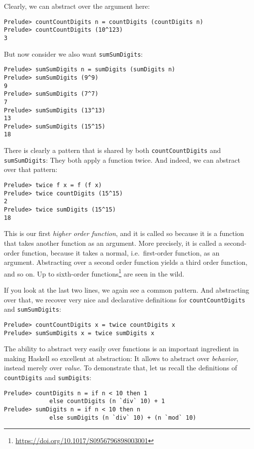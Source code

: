 \documentclass[11pt,
  american,
  DIV13]{article}
\DeclareRobustCommand{\href}[2]{#2\footnote{\url{#1}}}
\begin{document}
Clearly, we can abstract over the argument here:

\begin{verbatim}
Prelude> countCountDigits n = countDigits (countDigits n)
Prelude> countCountDigits (10^123)
3
\end{verbatim}

But now consider we also want \texttt{sumSumDigits}:

\begin{verbatim}
Prelude> sumSumDigits n = sumDigits (sumDigits n)
Prelude> sumSumDigits (9^9)
9
Prelude> sumSumDigits (7^7)
7
Prelude> sumSumDigits (13^13)
13
Prelude> sumSumDigits (15^15)
18
\end{verbatim}

There is clearly a pattern that is shared by both
\texttt{countCountDigits} and \texttt{sumSumDigits}: They both apply a
function twice. And indeed, we can abstract over that pattern:

\begin{verbatim}
Prelude> twice f x = f (f x)
Prelude> twice countDigits (15^15)
2
Prelude> twice sumDigits (15^15)
18
\end{verbatim}

This is our first \emph{higher order function}, and it is called so
because it is a function that takes another function as an argument.
More precisely, it is called a second-order function, because it takes a
normal, i.e.~first-order function, as an argument. Abstracting over a
second order function yields a third order function, and so on. Up to
\href{https://doi.org/10.1017/S0956796898003001}{sixth-order functions}
are seen in the wild.

If you look at the last two lines, we again see a common pattern. And
abstracting over that, we recover very nice and declarative definitions
for \texttt{countCountDigits} and \texttt{sumSumDigits}:

\begin{verbatim}
Prelude> countCountDigits x = twice countDigits x
Prelude> sumSumDigits x = twice sumDigits x
\end{verbatim}

The ability to abstract very easily over functions is an important
ingredient in making Haskell so excellent at abstraction: It allows to
abstract over \emph{behavior}, instead merely over \emph{value}. To
demonstrate that, let us recall the definitions of \texttt{countDigits}
and \texttt{sumDigits}:

\begin{verbatim}
Prelude> countDigits n = if n < 10 then 1 
             else countDigits (n `div` 10) + 1
Prelude> sumDigits n = if n < 10 then n 
             else sumDigits (n `div` 10) + (n `mod` 10)
\end{verbatim}
\end{document}
